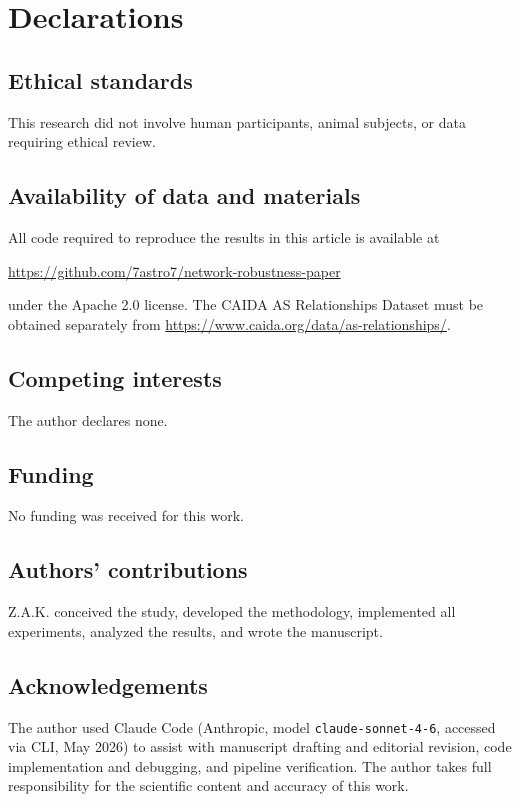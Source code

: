 \documentclass{nws}
\newif\ifblind
\begin{document}
\section*{Declarations}

\subsection*{Ethical standards}
This research did not involve human participants, animal subjects, or data requiring ethical review.

\subsection*{Availability of data and materials}
All code required to reproduce the results in this article is available at
\ifblind
  [repository URL anonymised for review]
\else
  \url{https://github.com/7astro7/network-robustness-paper}
\fi
under the Apache 2.0 license. The CAIDA AS Relationships Dataset must be obtained separately from \url{https://www.caida.org/data/as-relationships/}.

\subsection*{Competing interests}
The author declares none.

\subsection*{Funding}
No funding was received for this work.

\ifblind\else
\subsection*{Authors' contributions}
Z.A.K. conceived the study, developed the methodology, implemented all experiments, analyzed the results, and wrote the manuscript.
\fi

\subsection*{Acknowledgements}
The author used Claude Code (Anthropic, model \texttt{claude-sonnet-4-6}, accessed via CLI, May 2026) to assist with manuscript drafting and editorial revision, code implementation and debugging, and pipeline verification. The author takes full responsibility for the scientific content and accuracy of this work.

\clearpage


\end{document}
